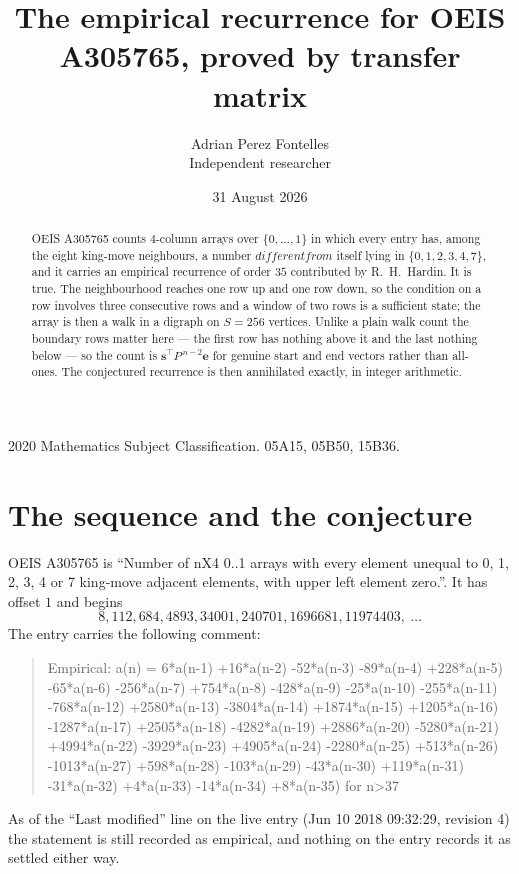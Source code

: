 \documentclass[11pt,a4paper]{article}
\title{The empirical recurrence for OEIS A305765, proved by transfer matrix}
\author{Adrian Perez Fontelles\\ \small Independent researcher}
\date{31 August 2026}
\theoremstyle{plain}
\theoremstyle{definition}
\begin{document}
\maketitle

\begin{abstract}
OEIS A305765 counts $4$-column arrays over $\{0,\dots,1\}$ in which every entry has,
among the eight king-move neighbours, a number $different from$ itself lying in $\{0,1,2,3,4,7\}$, and it carries an empirical
recurrence of order $35$ contributed by R.~H.~Hardin. It is true. The neighbourhood
reaches one row up and one row down, so the condition on a row involves three consecutive
rows and a window of two rows is a sufficient state; the array is then a walk in a digraph
on $S=256$ vertices. Unlike a plain walk count the boundary rows matter here --- the first
row has nothing above it and the last nothing below --- so the count is
$\mathbf{s}^{\!\top}P^{\,n-2}\mathbf{e}$ for genuine start and end vectors rather than
all-ones. The conjectured recurrence is then annihilated exactly, in integer arithmetic.
\end{abstract}

\noindent\small 2020 Mathematics Subject Classification. 05A15, 05B50, 15B36.\normalsize

\section{The sequence and the conjecture}

OEIS A305765 is ``Number of nX4 0..1 arrays with every element unequal to 0, 1, 2, 3, 4 or 7 king-move adjacent elements, with upper left element zero.''. It has offset
$1$ and begins
\[
8, 112, 684, 4893, 34001, 240701, 1696681, 11974403,\ \dots
\]
The entry carries the following comment:
\begin{quote}\small
Empirical: a(n) = 6*a(n-1) +16*a(n-2) -52*a(n-3) -89*a(n-4) +228*a(n-5) -65*a(n-6) -256*a(n-7) +754*a(n-8) -428*a(n-9) -25*a(n-10) -255*a(n-11) -768*a(n-12) +2580*a(n-13) -3804*a(n-14) +1874*a(n-15) +1205*a(n-16) -1287*a(n-17) +2505*a(n-18) -4282*a(n-19) +2886*a(n-20) -5280*a(n-21) +4994*a(n-22) -3929*a(n-23) +4905*a(n-24) -2280*a(n-25) +513*a(n-26) -1013*a(n-27) +598*a(n-28) -103*a(n-29) -43*a(n-30) +119*a(n-31) -31*a(n-32) +4*a(n-33) -14*a(n-34) +8*a(n-35) for n>37
\end{quote}
As of the ``Last modified'' line on the live entry (Jun 10 2018 09:32:29, revision
4) the statement is still recorded as empirical, and nothing on the entry
records it as settled either way.
\end{document}
